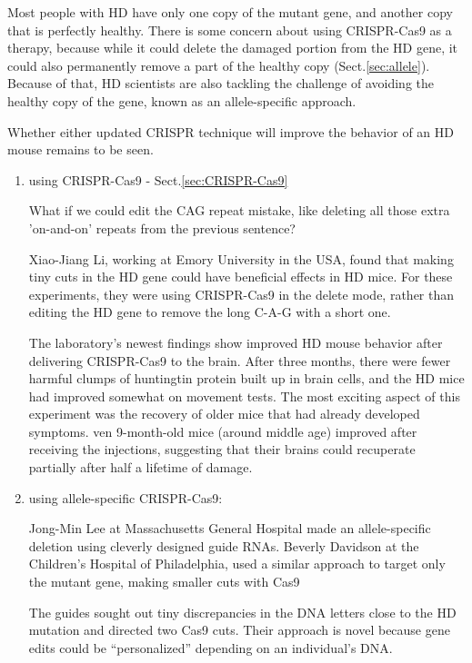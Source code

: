 Most people with HD have only one copy of the mutant gene, and another copy that
is perfectly healthy. There is some concern about using CRISPR-Cas9 as a
therapy, because while it could delete the damaged portion from the HD gene, it
could also permanently remove a part of the healthy copy
(Sect.\ref{sec:allele}). Because of that, HD scientists are also tackling the
challenge of avoiding the healthy copy of the gene, known as an allele-specific
approach.

Whether either updated CRISPR technique will improve the behavior of an HD mouse
remains to be seen.

\begin{enumerate}
  \item  using CRISPR-Cas9 - Sect.\ref{sec:CRISPR-Cas9}
  
  What if we could edit the CAG repeat mistake, like deleting all those
  extra 'on-and-on' repeats from the previous sentence?
  
  Xiao-Jiang Li, working at Emory University in the USA, found that making tiny
cuts in the HD gene could have beneficial effects in HD mice. For these
experiments, they were using CRISPR-Cas9 in the delete mode, rather than editing
the HD gene to remove the long C-A-G with a short one.
  
  The laboratory's newest findings show improved HD mouse behavior after
  delivering CRISPR-Cas9 to the brain.
  After three months, there were fewer harmful clumps of huntingtin protein
   built up in brain cells, and the HD mice had improved somewhat on movement
   tests. The most exciting aspect of this experiment was the recovery of older
   mice that had already developed symptoms.  ven 9-month-old mice (around
   middle age) improved after receiving the injections, suggesting that their
   brains could recuperate partially after half a lifetime of damage. 
   
 \item using allele-specific CRISPR-Cas9:

Jong-Min Lee at Massachusetts General
Hospital made an allele-specific deletion using cleverly designed guide RNAs.  
  Beverly Davidson at the Children's Hospital of Philadelphia, used a similar
  approach to target only the mutant gene, making smaller cuts with Cas9
  
  
The guides sought out tiny discrepancies in the DNA letters close to the HD
  mutation and directed two Cas9 cuts. Their approach is novel because gene
  edits could be “personalized” depending on an individual's DNA.  

  
\end{enumerate}



